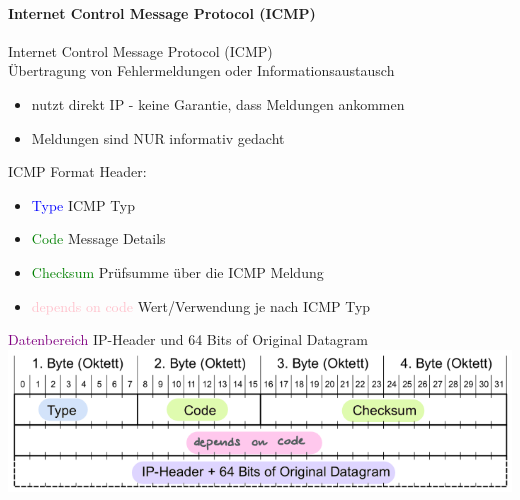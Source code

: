 \paragraph{Internet Control Message Protocol (ICMP)}

\begin{concept}{Internet Control Message Protocol (ICMP)}\\
    Übertragung von Fehlermeldungen oder Informationsaustausch
    \begin{itemize}
        \item nutzt direkt IP - keine Garantie, dass Meldungen ankommen
        \item Meldungen sind NUR informativ gedacht
    \end{itemize}
\end{concept}

\begin{KR}{ICMP Format}
    Header:
    \begin{itemize}
        \item \textcolor{blue}{Type} ICMP Typ
        \item \textcolor{green}{Code} Message Details
        \item \textcolor{green}{Checksum} Prüfsumme über die ICMP Meldung
        \item \textcolor{pink}{depends on code} Wert/Verwendung je nach ICMP Typ
    \end{itemize}
    \textcolor{purple}{Datenbereich} IP-Header und 64 Bits of Original Datagram
    \includegraphics[width=1\linewidth]{images/icmp_details.png}
\end{KR}

